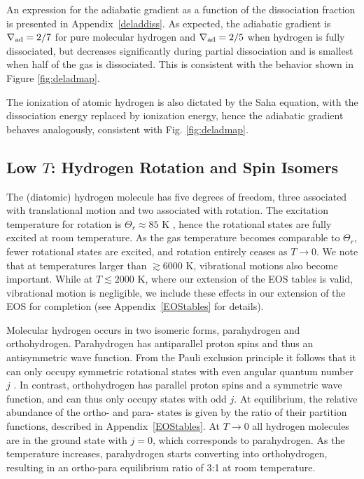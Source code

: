 \documentclass[apj]{emulateapj}
\newcommand{\delad}{\nabla_{\rm ad}}
\newcommand{\App}[1]{Appendix~\ref{#1}}
\begin{document}

An expression for the adiabatic gradient as a function of the dissociation fraction is presented in \App{deladdiss}. As expected, the adiabatic gradient is $\delad=2/7$ for pure molecular hydrogen and $\delad=2/5$ when hydrogen is fully dissociated, but decreases significantly during partial dissociation and is smallest when half of the gas is dissociated. This is consistent with the behavior shown in Figure \ref{fig:deladmap}. 

The ionization of atomic hydrogen is also dictated by the Saha equation, with the dissociation energy replaced by ionization energy, hence the adiabatic gradient behaves analogously, consistent with Fig. \ref{fig:deladmap}.




\subsection{Low $T$: Hydrogen Rotation and Spin Isomers}

The (diatomic) hydrogen molecule has five degrees of freedom, three associated with translational motion and two associated with rotation. The excitation temperature for rotation is $\Theta_r \approx 85$ K \citep{kittel}, hence the rotational states are fully excited at room temperature. As the gas temperature becomes comparable to $\Theta_r$, fewer rotational states are excited, and rotation entirely ceases as $T \rightarrow 0$. We note that at temperatures larger than $\gtrsim 6000$ K, vibrational motions also become important. While at $T\lesssim2000$ K, where our extension of the \citet{saumon95} EOS tables is valid, vibrational motion is negligible, we include these effects in our extension of the EOS for completion (see \App{EOStables} for details).

 Molecular hydrogen occurs in two isomeric forms, parahydrogen and orthohydrogen. Parahydrogen has antiparallel proton spins and thus an antisymmetric wave function. From the Pauli exclusion principle it follows that it can only occupy symmetric rotational states with even angular quantum number $j$ \citep{farkas35}. In contrast, orthohydrogen has parallel proton spins and a symmetric wave function, and can thus only occupy states with odd $j$. At equilibrium, the relative abundance of the ortho- and para- states is given by the ratio of their partition functions, described in \App{EOStables}. At $T \rightarrow 0$ all hydrogen molecules are in the ground state with $j=0$, which corresponds to parahydrogen.  As the temperature increases, parahydrogen starts converting into orthohydrogen, resulting in an ortho-para equilibrium ratio of 3:1 at room temperature.
 
\end{document}
